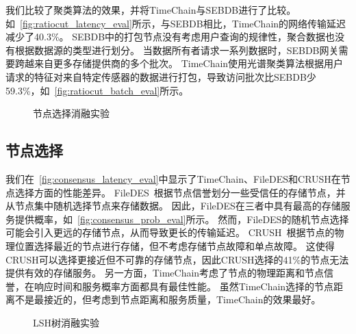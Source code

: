 我们比较了聚类算法的效果，并将TimeChain与SEBDB进行了比较。
如~\autoref{fig:ratiocut_latency_eval}所示，与SEBDB相比，TimeChain的网络传输延迟减少了40.3\%。
SEBDB中的打包节点没有考虑用户查询的规律性，聚合数据也没有根据数据源的类型进行划分。
当数据所有者请求一系列数据时，SEBDB网关需要跨越来自更多存储提供商的多个批次。
TimeChain使用光谱聚类算法根据用户请求的特征对来自特定传感器的数据进行打包，导致访问批次比SEBDB少59.3\%，如~\autoref{fig:ratiocut_batch_eval}所示。

\begin{figure*}[t]
    \centering
    \begin{minipage}{0.96\linewidth}
        \vspace{0.5ex}
        \caption{节点选择消融实验} 
    \end{minipage}
\end{figure*}

\subsection{节点选择}
我们在~\autoref{fig:consensus_latency_eval}中显示了TimeChain、FileDES和CRUSH在节点选择方面的性能差异。
FileDES~\cite{xu2024filedes}根据节点信誉划分一些受信任的存储节点，并从节点集中随机选择节点来存储数据。
因此，FileDES在三者中具有最高的存储服务提供概率，如~\autoref{fig:consensus_prob_eval}所示。
然而，FileDES的随机节点选择可能会引入更远的存储节点，从而导致更长的传输延迟。
CRUSH~\cite{weil2006ceph}根据节点的物理位置选择最近的节点进行存储，但不考虑存储节点故障和单点故障。
这使得CRUSH可以选择更接近但不可靠的存储节点，因此CRUSH选择的41\%的节点无法提供有效的存储服务。
另一方面，TimeChain考虑了节点的物理距离和节点信誉，在响应时间和服务概率方面都具有最佳性能。
虽然TimeChain选择的节点距离不是最接近的，但考虑到节点距离和服务质量，TimeChain的效果最好。

\begin{figure*}[t]
    \centering
    \begin{minipage}{0.96\linewidth}
        \vspace{-0.5ex}
        \caption{LSH树消融实验} 
    \end{minipage}
\end{figure*}

